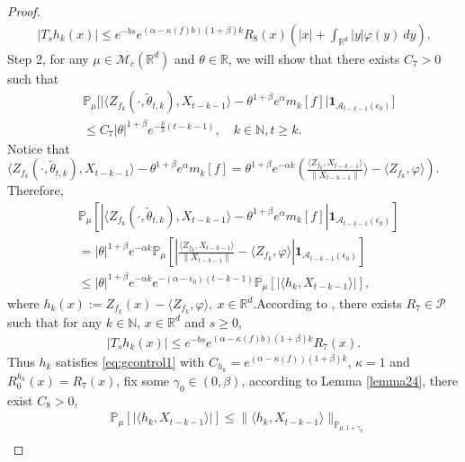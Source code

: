 \documentclass[12pt,oneside,english]{amsart}
\theoremstyle{plain}
\theoremstyle{definition}
\numberwithin{equation}{section}
\newcommand{\added}[1]{{\color{blue}#1}}\newcommand{\deleted}[1]{{\color{red}#1}}
\begin{document}
\begin{proof}
{\begin{align}
    |T_s h_k(x)|\leq e^{-bs}e^{(\alpha-\kappa(f)b)(1+\beta)k}R_8(x)(|x|+\int_{\mathbb{R}^d}|y|\varphi(y)~dy).
\end{align}
}
Step 2, for any $\mu \in \mathcal{M}_c(\mathbb{R}^d)$ and $\theta\in \mathbb{R}$, we will show that there exists $C_7>0$ such that
\begin{align}
\label{eq:31step3}
    &\mathbb{P}_{\mu}\big[\big|\langle Z_{f_k}(\cdot,\tilde{\theta}_{t,k}),X_{t-k-1}\rangle-\theta^{1+\beta}e^{\alpha}m_k[f]\big|\mathbf{1}_{\mathcal{A}_{t-k-1}(\epsilon_0)}\big]\\
    &\leq C_7|\theta|^{1+\beta} e^{-\frac{p}{2}(t-k-1)},\quad k\in \mathbb{N}, t\geq k.
\end{align}
    Notice that $\langle Z_{f_k}(\cdot,\tilde{\theta}_{t,k}),X_{t-k-1}\rangle-\theta^{1+\beta}e^{\alpha}m_k[f]=\theta^{1+\beta}e^{-\alpha k}(\frac{\langle Z_{f_k},X_{t-k-1}\rangle}{\|X_{t-k-1}\|} \rangle-\langle Z_{f_k},\varphi\rangle)$. Therefore,
\begin{align}
        &\mathbb{P}_{\mu}\left[\left|\langle Z_{f_k}(\cdot,\tilde{\theta}_{t,k}),X_{t-k-1}\rangle-\theta^{1+\beta}e^{\alpha}m_k[f]\right|\mathbf{1}_{\mathcal{A}_{t-k-1}(\epsilon_0)}\right]\\
    &=|\theta|^{1+\beta}e^{-\alpha k}\mathbb{P}_{\mu}\left[\left|\frac{\langle Z_{f_k},X_{t-k-1}\rangle}{\|X_{t-k-1}\|}-\langle Z_{f_k},\varphi\rangle\right|\mathbf{1}_{\mathcal{A}_{t-k-1}(\epsilon_0)}\right]\nonumber\\
    &\leq |\theta|^{1+\beta}e^{-\alpha k}e^{-(\alpha-\epsilon_0)(t-k-1)}\mathbb{P}_{\mu}\left[\left|\langle h_k,X_{t-k-1}\rangle\right|\right],\label{II1}
\end{align}
\added{
where $h_k(x):=Z_{f_k}(x)-\langle Z_{f_k},\varphi\rangle,~x\in\mathbb{R}^d$.According to \cite[Lemma 2.8]{MM}, there exists $R_7\in \mathcal{P}$ such that for any $k\in\mathbb{N}$, $x\in \mathbb{R}^d$ and $s\geq 0$,
 \begin{align}
 \label{eq:31step2}
     |T_s h_k(x)|\leq e^{-bs}e^{(\alpha-\kappa(f)b)(1+\beta)k}R_7(x).
 \end{align}
}
Thus $h_k$ satisfies \eqref{eq:gcontrol1} with $C_{h_k}=e^{(\alpha-\kappa(f))(1+\beta)k}$, $\kappa=1$ and $R_0^{h_k}(x)=R_7(x)$, fix some $\gamma_0\in(0,\beta)$, according to Lemma \ref{lemma24}, there exist $C_8>0$,
\begin{align}
    &\mathbb{P}_{\mu}\left[\left|\langle h_k,X_{t-k-1}\rangle\right|\right]\leq \|\langle h_k, X_{t-k-1}\rangle\|_{\mathbb{P}_{\mu,1+\gamma_0}}\\

\end{align}
\end{proof}
\end{document}
